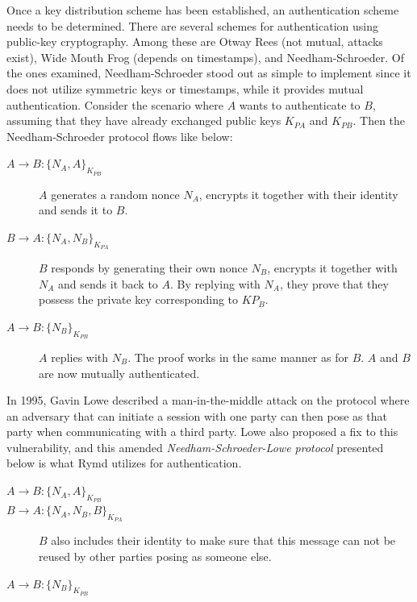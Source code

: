 Once a key distribution scheme has been established, an authentication scheme needs to be determined. There are several schemes for authentication using public-key cryptography. Among these are Otway Rees (not mutual, attacks exist\cite{Wang:2000}), Wide Mouth Frog\cite{Burrows:1990} (depends on timestamps), and Needham-Schroeder\cite{Needham:1978}. Of the ones examined, Needham-Schroeder stood out as simple to implement since it does not utilize symmetric keys or timestamps, while it provides mutual authentication. Consider the scenario where $A$ wants to authenticate to $B$, assuming that they have already exchanged public keys $K_{PA}$ and $K_{PB}$. Then the Needham-Schroeder protocol flows like below:

\begin{description}
  \item[$A \rightarrow B: \{N_A, A\}_{K_{PB}}$] $A$ generates a random nonce $N_A$, encrypts it together with their identity and sends it to $B$.
  \item[$B \rightarrow A: \{N_A, N_B\}_{K_{PA}}$] $B$ responds by generating their own nonce $N_B$, encrypts it together with $N_A$ and sends it back to $A$. By replying with $N_A$, they prove that they possess the private key corresponding to $KP_B$.
  \item[$A \rightarrow B: \{N_B\}_{K_{PB}}$] $A$ replies with $N_B$. The proof works in the same manner as for $B$. $A$ and $B$ are now mutually authenticated.
\end{description}

In 1995, Gavin Lowe described a man-in-the-middle attack on the protocol where an adversary that can initiate a session with one party can then pose as that party when communicating with a third party\cite{Lowe:1995}. Lowe also proposed a fix to this vulnerability, and this amended \emph{Needham-Schroeder-Lowe protocol} presented below is what Rymd utilizes for authentication.

\begin{description}
  \item[$A \rightarrow B: \{N_A, A\}_{K_{PB}}$]
  \item[$B \rightarrow A: \{N_A, N_B, B\}_{K_{PA}}$] $B$ also includes their identity to make sure that this message can not be reused by other parties posing as someone else.
  \item[$A \rightarrow B: \{N_B\}_{K_{PB}}$]
\end{description}

